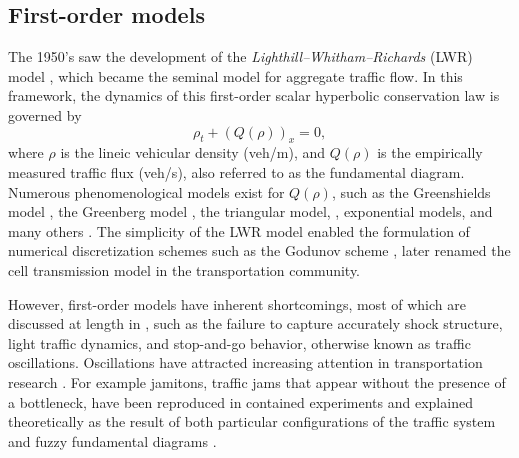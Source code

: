\documentclass[preprint]{elsarticle}
\begin{document}
\subsection{First-order models}
The 1950's saw the development of the \textit{Lighthill--Whitham--Richards}
(LWR) model \cite{LW,Richards}, which became the seminal model for aggregate
traffic flow. In this framework, the dynamics of this first-order scalar hyperbolic conservation law is governed by
\begin{equation}
\rho_t+\left(Q\left(\rho\right)\right)_x=0,
\end{equation}
where $\rho$ is the lineic vehicular density (veh/m), and $Q(\rho)$ is the empirically measured traffic flux (veh/s), also referred to as the fundamental diagram. Numerous phenomenological models exist for $Q(\rho)$,  such as the Greenshields model \cite{Greenshieldsflux}, the Greenberg model \cite{Greenbergflux}, the triangular model, \cite{Newell1993, daganzo1994cell}, exponential models, \cite{Wang2005141, Papageorgiou198929, Flynn09self-sustainednonlinear} and many others \cite{treiber2013traffic, garavello2006trafficbook}. The simplicity of the LWR model enabled the formulation of numerical discretization
schemes such as the Godunov scheme \cite{godunov,Osher}, later renamed the cell transmission
model \cite{daganzo1994cell,daganzo1995cell} in the transportation community. 

However, first-order models have inherent shortcomings, most of which are discussed at length in \cite{Dag_requiem}, such as the failure to capture accurately shock structure, light traffic dynamics, and stop-and-go behavior, otherwise known as traffic oscillations. Oscillations have attracted increasing attention in transportation research \cite{helbing2001traffic}. For example jamitons, traffic jams that appear without the presence of a bottleneck, have been reproduced in contained experiments \cite{Jamitons2008,Flynn08onjamitons} and explained theoretically
as the result of both particular configurations of the traffic system
\cite{Flynn09self-sustainednonlinear} and
fuzzy fundamental diagrams \cite{Jamitons-multi-valued-fund}. 

\end{document}

